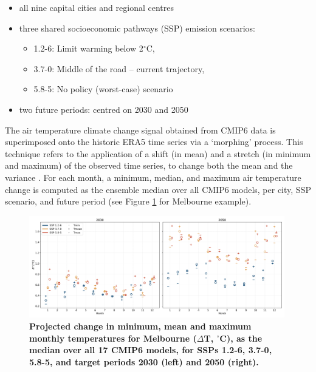 \documentclass[utf8]{frontiersSCNS} %
\begin{document}
\begin{itemize}
\item all nine capital cities and regional centres
	\item three shared socioeconomic pathways (SSP) emission scenarios:
	\begin{itemize}
	\item 1.2-6: Limit warming below 2$^{\circ}$C, 
	\item 3.7-0: Middle of the road -- current trajectory, 
	\item 5.8-5: No policy (worst-case) scenario
	\end{itemize}
\item two future periods: centred on 2030 and 2050
\end{itemize}

The air temperature climate change signal obtained from CMIP6 data is superimposed onto the historic ERA5 time series via a `morphing' process. This technique refers to the application of a shift (in mean) and a stretch (in minimum and maximum) of the observed time series, to change both the mean and the variance \citep{Belcher2005,Pulkkinen2021}. For each month, a minimum, median, and maximum air temperature change is computed as the ensemble median over all CMIP6 models, per city, SSP scenario, and future period (see Figure \ref{fig:MelCmip} for Melbourne example). 

\begin{figure}
\centering
\includegraphics[width=0.99\textwidth]{images/image2.jpg}
\caption{\bf Projected change in minimum, mean and maximum monthly temperatures for Melbourne ($\Delta$T, $^{\circ}$C), as the median over all 17 CMIP6 models, for SSPs 1.2-6, 3.7-0, 5.8-5, and target periods 2030 (left) and 2050 (right).}
 \label{fig:MelCmip}
\end{figure}
\end{document}

